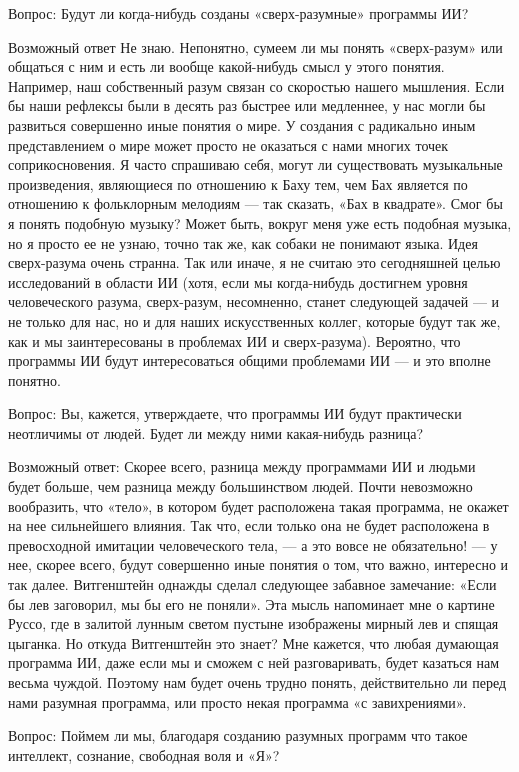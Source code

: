 \documentclass[../main.tex]{subfiles}
\begin{document}
Вопрос: Будут ли когда-нибудь созданы «сверх-разумные» программы ИИ?

Возможный ответ Не знаю. Непонятно, сумеем ли мы понять «сверх-разум» или общаться с ним и есть ли вообще какой-нибудь смысл у этого понятия. Например, наш собственный разум связан со скоростью нашего мышления. Если бы наши рефлексы были в десять раз быстрее или медленнее, у нас могли бы развиться совершенно иные понятия о мире. У создания с радикально иным представлением о мире может просто не оказаться с нами многих точек соприкосновения. Я часто спрашиваю себя, могут ли существовать музыкальные произведения, являющиеся по отношению к Баху тем, чем Бах является по отношению к фольклорным мелодиям --- так сказать, «Бах в квадрате». Смог бы я понять подобную музыку? Может быть, вокруг меня уже есть подобная музыка, но я просто ее не узнаю, точно так же, как собаки не понимают языка. Идея сверх-разума очень странна. Так или иначе, я не считаю это сегодняшней целью исследований в области ИИ (хотя, если мы когда-нибудь достигнем уровня человеческого разума, сверх-разум, несомненно, станет следующей задачей --- и не только для нас, но и для наших искусственных коллег, которые будут так же, как и мы заинтересованы в проблемах ИИ и сверх-разума). Вероятно, что программы ИИ будут интересоваться общими проблемами ИИ --- и это вполне понятно.

Вопрос: Вы, кажется, утверждаете, что программы ИИ будут практически неотличимы от людей. Будет ли между ними какая-нибудь разница?

Возможный ответ: Скорее всего, разница между программами ИИ и людьми будет больше, чем разница между большинством людей. Почти невозможно вообразить, что «тело», в котором будет расположена такая программа, не окажет на нее сильнейшего влияния. Так что, если только она не будет расположена в превосходной имитации человеческого тела, --- а это вовсе не обязательно! --- у нее, скорее всего, будут совершенно иные понятия о том, что важно, интересно и так далее. Витгенштейн однажды сделал следующее забавное замечание: «Если бы лев заговорил, мы бы его не поняли». Эта мысль напоминает мне о картине Руссо, где в залитой лунным светом пустыне изображены мирный лев и спящая цыганка. Но откуда Витгенштейн это знает? Мне кажется, что любая думающая программа ИИ, даже если мы и сможем с ней разговаривать, будет казаться нам весьма чуждой. Поэтому нам будет очень трудно понять, действительно ли перед нами разумная программа, или просто некая программа «с завихрениями».

Вопрос: Поймем ли мы, благодаря созданию разумных программ что такое интеллект, сознание, свободная воля и «Я»?
\end{document}

